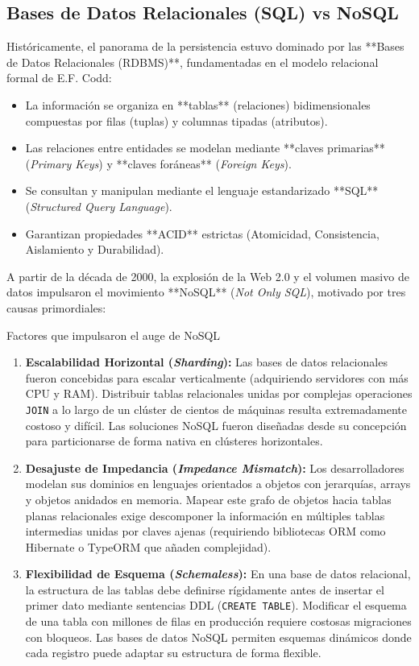 \subsection{Bases de Datos Relacionales (SQL) vs NoSQL}

Históricamente, el panorama de la persistencia estuvo dominado por las **Bases de Datos Relacionales (RDBMS)**, fundamentadas en el modelo relacional formal de E.F. Codd:
\begin{itemize}
    \item La información se organiza en **tablas** (relaciones) bidimensionales compuestas por filas (tuplas) y columnas tipadas (atributos).
    \item Las relaciones entre entidades se modelan mediante **claves primarias** (\emph{Primary Keys}) y **claves foráneas** (\emph{Foreign Keys}).
    \item Se consultan y manipulan mediante el lenguaje estandarizado **SQL** (\emph{Structured Query Language}).
    \item Garantizan propiedades **ACID** estrictas (Atomicidad, Consistencia, Aislamiento y Durabilidad).
\end{itemize}

A partir de la década de 2000, la explosión de la Web 2.0 y el volumen masivo de datos impulsaron el movimiento **NoSQL** (\emph{Not Only SQL}), motivado por tres causas primordiales:

\begin{definicion}{Factores que impulsaron el auge de NoSQL}
\begin{enumerate}
    \item \textbf{Escalabilidad Horizontal (\emph{Sharding}):} Las bases de datos relacionales fueron concebidas para escalar verticalmente (adquiriendo servidores con más CPU y RAM). Distribuir tablas relacionales unidas por complejas operaciones \texttt{JOIN} a lo largo de un clúster de cientos de máquinas resulta extremadamente costoso y difícil. Las soluciones NoSQL fueron diseñadas desde su concepción para particionarse de forma nativa en clústeres horizontales.
    \item \textbf{Desajuste de Impedancia (\emph{Impedance Mismatch}):} Los desarrolladores modelan sus dominios en lenguajes orientados a objetos con jerarquías, arrays y objetos anidados en memoria. Mapear este grafo de objetos hacia tablas planas relacionales exige descomponer la información en múltiples tablas intermedias unidas por claves ajenas (requiriendo bibliotecas ORM como Hibernate o TypeORM que añaden complejidad).
    \item \textbf{Flexibilidad de Esquema (\emph{Schemaless}):} En una base de datos relacional, la estructura de las tablas debe definirse rígidamente antes de insertar el primer dato mediante sentencias DDL (\texttt{CREATE TABLE}). Modificar el esquema de una tabla con millones de filas en producción requiere costosas migraciones con bloqueos. Las bases de datos NoSQL permiten esquemas dinámicos donde cada registro puede adaptar su estructura de forma flexible.
\end{enumerate}
\end{definicion}

